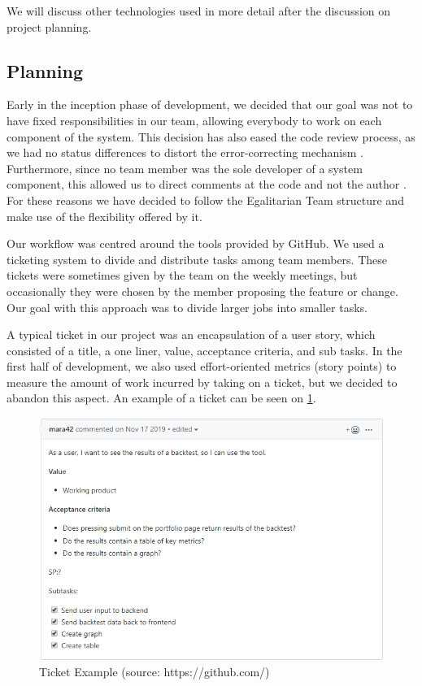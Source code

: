 \documentclass[main.tex]{subfiles}
\begin{document}
We will discuss other technologies used in more detail after the discussion on project planning.

\subsection{Planning}

Early in the inception phase of development, we decided that our goal was not to have fixed responsibilities in our team, allowing everybody to work on each component of the system. This decision has also eased the code review process, as we had no status differences to distort the error-correcting mechanism \cite{statusdifference}. Furthermore, since no team member was the sole developer of a system component, this allowed us to direct comments at the code and not the author \cite{howtoreview}. For these reasons we have decided to follow the Egalitarian Team structure and make use of the flexibility offered by it.

Our workflow was centred around the tools provided by GitHub. We used a ticketing system to divide and distribute tasks among team members. These tickets were sometimes given by the team on the weekly meetings, but occasionally they were chosen by the member proposing the feature or change. Our goal with this approach was to divide larger jobs into smaller tasks.

A typical ticket in our project was an encapsulation of a user story, which consisted of a title, a one liner, value, acceptance criteria, and sub tasks. In the first half of development, we also used effort-oriented metrics (story points) to measure the amount of work incurred by taking on a ticket, but we decided to abandon this aspect. An example of a ticket can be seen on \figurename{\ref{Ticket}}.

\begin{figure}[H]
   \centering
   \includegraphics[scale=0.7]{05Coding/05Pictures/ticket.png}
   \caption{Ticket Example (source: https://github.com/)}
   \label{Ticket}
\end{figure}
\end{document}
